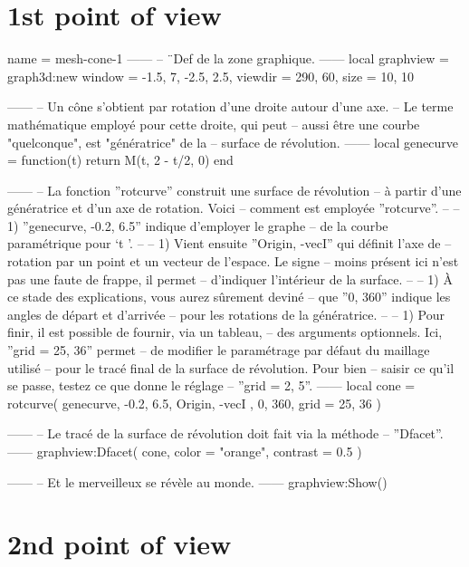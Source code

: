 \documentclass[varwidth]{standalone}
\begin{document}
\section*{1st point of view}

\begin{luadraw}{name = mesh-cone-1}
------
-- ¨Def de la zone graphique.
------
local graphview = graph3d:new{
  window  = {-1.5, 7, -2.5, 2.5},
  viewdir = {290, 60},
  size    = {10, 10}
}

------
-- Un cône s'obtient par rotation d'une droite autour d'une axe.
-- Le terme mathématique employé pour cette droite, qui peut
-- aussi être une courbe "quelconque", est "génératrice" de la
-- surface de révolution.
------
local genecurve = function(t)
  return M(t, 2 - t/2, 0)
end

------
-- La fonction ''rotcurve'' construit une surface de révolution
-- à partir d'une génératrice et d'un axe de rotation. Voici
-- comment est employée ''rotcurve''.
--
--     1) ''genecurve, -0.2, 6.5'' indique d'employer le graphe
--     de la courbe paramétrique pour `t \in [-0.2 .. 6.5]'.
--
--     1) Vient ensuite ''{Origin, -vecI}'' qui définit l'axe de
--     rotation par un point et un vecteur de l'espace. Le signe
--     moins présent ici n'est pas une faute de frappe, il permet
--     d'indiquer l'intérieur de la surface.
--
--     1) À ce stade des explications, vous aurez sûrement deviné
--     que ''0, 360'' indique les angles de départ et d'arrivée
--     pour les rotations de la génératrice.
--
--     1) Pour finir, il est possible de fournir, via un tableau,
--     des arguments optionnels. Ici, ''grid = {25, 36}'' permet
--     de modifier le paramétrage par défaut du maillage utilisé
--     pour le tracé final de la surface de révolution. Pour bien
--     saisir ce qu'il se passe, testez ce que donne le réglage
--     ''grid = {2, 5}''.
------
local cone = rotcurve(
  genecurve, -0.2, 6.5,
  {
    Origin, -vecI
  },
  0, 360,
  {
    grid = {25, 36}
  })

------
-- Le tracé de la surface de révolution doit fait via la méthode
-- ''Dfacet''.
------
graphview:Dfacet(
  cone,
  {
    color  = "orange",
    contrast = 0.5
  })

------
-- Et le merveilleux se révèle au monde.
------
graphview:Show()
\end{luadraw}


\section*{2nd point of view}
\end{document}
